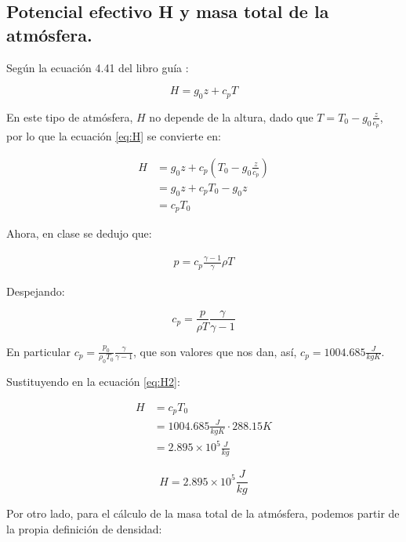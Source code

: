 \subsection{Potencial efectivo H y masa total de la atmósfera.}

Según la ecuación 4.41 del  libro guía \cite{lautrup2005physics}:

\begin{equation}
    H = g_0 z + c_p T \label{eq:H}
\end{equation}

En este tipo de atmósfera, $H$ no depende de la altura, dado que $T =  T_0 - g_0 \frac{z}{c_p}$, por lo que la ecuación \ref{eq:H} se convierte en:

\begin{align*}
    H &= g_0 z + c_p (T_0 - g_0 \frac{z}{c_p}) \\
    &= g_0 z + c_p T_0 - g_0 z \\
    &= c_p T_0  \label{eq:H2}
\end{align*}

Ahora, en clase se dedujo que:

\begin{align*}
    p = c_p \frac{\gamma - 1}{\gamma} \rho T
\end{align*}

Despejando:

\begin{equation}
    c_p = \frac{p}{\rho T} \frac{\gamma}{\gamma - 1} \label{eq:cp}
\end{equation}

En particular $c_p = \frac{p_0}{\rho_0 T_0} \frac{\gamma}{\gamma - 1}$, que son valores que nos dan, así, $c_p = 1004.685 \frac{J}{kg K}$.

Sustituyendo en la ecuación \ref{eq:H2}:

\begin{align*}
    H &= c_p T_0 \\
    &= 1004.685 \frac{J}{kg K} \cdot 288.15 K \\
    &= 2.895 \times 10^5 \frac{J}{kg}
\end{align*}

\begin{equation}
    \boxed{H = 2.895 \times 10^5 \frac{J}{kg} }\label{eq:H3}
\end{equation}

Por otro lado, para el cálculo de la masa total de la atmósfera, podemos partir de la propia definición de densidad:

